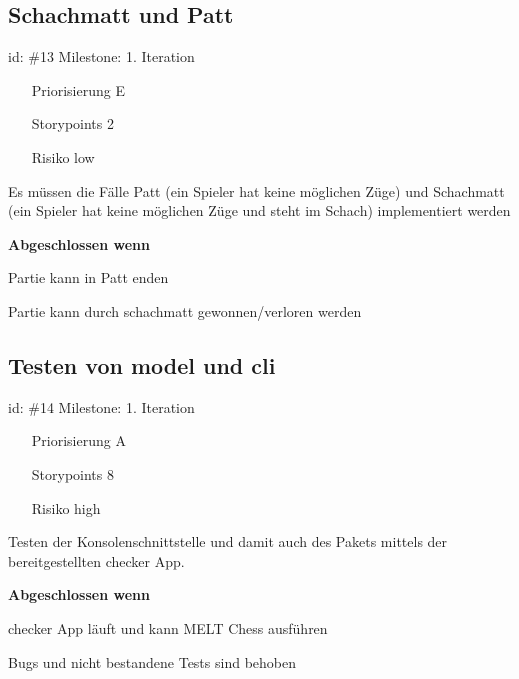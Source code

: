 \subsection*{Schachmatt und Patt}
id: \#13 Milestone: 1. Iteration\\

\begin{itemize}
\item[Priorisierung] E
\item[Storypoints] 2
\item[Risiko] low
\end{itemize}

Es müssen die Fälle Patt (ein Spieler hat keine möglichen Züge) und Schachmatt (ein Spieler hat keine möglichen Züge und steht im Schach) implementiert werden

\textbf{Abgeschlossen wenn}
\begin{todolist}
    \item[\done]  Partie kann in Patt enden
  \item[\done]  Partie kann durch schachmatt gewonnen/verloren werden

\end{todolist}


\subsection*{Testen von model und cli}
id: \#14 Milestone: 1. Iteration\\

\begin{itemize}
\item[Priorisierung] A
\item[Storypoints] 8
\item[Risiko] high
\end{itemize}

Testen der Konsolenschnittstelle und damit auch des  Pakets mittels der bereitgestellten checker App.

\textbf{Abgeschlossen wenn}
\begin{todolist}
    \item[\done]  checker App läuft und kann MELT Chess ausführen
  \item[\done]  Bugs und nicht bestandene Tests sind behoben

\end{todolist}

